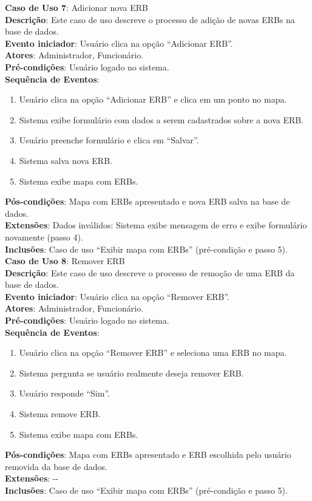 \documentclass[]{politex}
\begin{document}
\noindent \textbf{Caso de Uso 7}: Adicionar nova ERB \\
\textbf{Descrição}: Este caso de uso descreve o processo de adição de novas
ERBs na base de dados. \\
\textbf{Evento iniciador}: Usuário clica na opção ``Adicionar ERB''. \\
\textbf{Atores}: Administrador, Funcionário. \\
\textbf{Pré-condições}: Usuário logado no sistema. \\
\textbf{Sequência de Eventos}:
\begin{enumerate}
\item Usuário clica na opção ``Adicionar ERB'' e clica em um ponto no mapa.
\item Sistema exibe formulário com dados a serem cadastrados sobre a nova ERB.
\item Usuário preenche formulário e clica em ``Salvar''.
\item Sistema salva nova ERB.
\item Sistema exibe mapa com ERBs.
\end{enumerate}
\textbf{Pós-condições}: Mapa com ERBs apresentado e nova ERB salva na base de
dados. \\
\textbf{Extensões}: Dados inválidos: Sistema exibe mensagem de erro e exibe
formulário novamente (passo 4). \\
\textbf{Inclusões}: Caso de uso ``Exibir mapa com ERBs'' (pré-condição e passo 5).\\

\noindent \textbf{Caso de Uso 8}: Remover ERB \\
\textbf{Descrição}: Este caso de uso descreve o processo de remoção de uma ERB da
base de dados. \\
\textbf{Evento iniciador}: Usuário clica na opção ``Remover ERB''. \\
\textbf{Atores}: Administrador, Funcionário. \\
\textbf{Pré-condições}: Usuário logado no sistema. \\
\textbf{Sequência de Eventos}:
\begin{enumerate}
\item Usuário clica na opção ``Remover ERB'' e seleciona uma ERB no mapa.
\item Sistema pergunta se usuário realmente deseja remover ERB.
\item Usuário responde ``Sim''.
\item Sistema remove ERB.
\item Sistema exibe mapa com ERBs.
\end{enumerate}
\textbf{Pós-condições}: Mapa com ERBs apresentado e ERB escolhida pelo usuário
removida da base de dados. \\
\textbf{Extensões}: -{}- \\
\textbf{Inclusões}: Caso de uso ``Exibir mapa com ERBs'' (pré-condição e passo 5). \\
\end{document}
